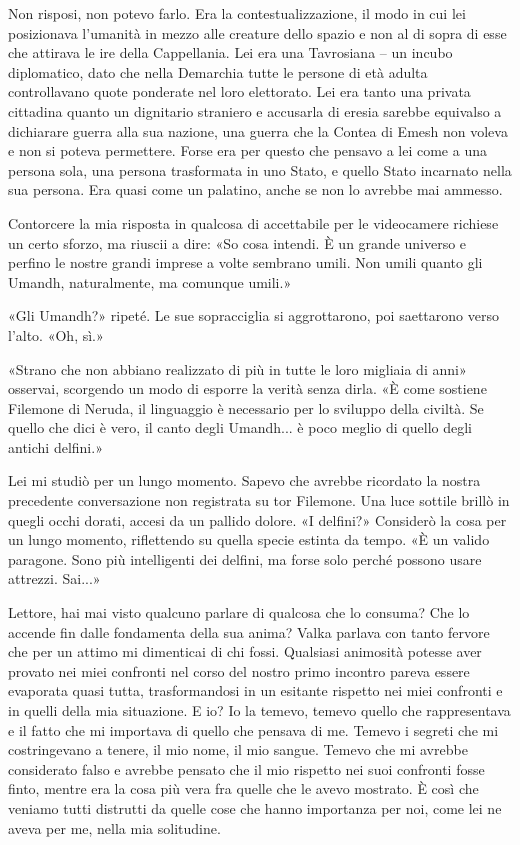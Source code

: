 Non risposi, non potevo farlo. Era la contestualizzazione, il modo in
cui lei posizionava l'umanità in mezzo alle creature dello spazio e non
al di sopra di esse che attirava le ire della Cappellania. Lei era una
Tavrosiana -- un incubo diplomatico, dato che nella Demarchia tutte le
persone di età adulta controllavano quote ponderate nel loro elettorato.
Lei era tanto una privata cittadina quanto un dignitario straniero e
accusarla di eresia sarebbe equivalso a dichiarare guerra alla sua
nazione, una guerra che la Contea di {Emesh} non voleva e non si poteva
permettere. Forse era per questo che pensavo a lei come a una persona
sola, una persona trasformata in uno Stato, e quello Stato incarnato
nella sua persona. Era quasi come un palatino, anche se non lo avrebbe
mai ammesso.

Contorcere la mia risposta in qualcosa di accettabile per le videocamere
richiese un certo sforzo, ma riuscii a dire: «So cosa intendi. È un
grande universo e perfino le nostre grandi imprese a volte sembrano
umili. Non umili quanto gli Umandh, naturalmente, ma comunque umili.»

«Gli Umandh?» ripeté. Le sue sopracciglia si aggrottarono, poi
saettarono verso l'alto. «Oh, sì.»

«Strano che non abbiano realizzato di più in tutte le loro migliaia di
anni» osservai, scorgendo un modo di esporre la verità senza dirla. «È
come sostiene Filemone di Neruda, il linguaggio è necessario per lo
sviluppo della civiltà. Se quello che dici è vero, il canto degli
Umandh... è poco meglio di quello degli antichi delfini.»

Lei mi studiò per un lungo momento. Sapevo che avrebbe ricordato la
nostra precedente conversazione non registrata su tor Filemone. Una luce
sottile brillò in quegli occhi dorati, accesi da un pallido dolore. «I
delfini?» Considerò la cosa per un lungo momento, riflettendo su quella
specie estinta da tempo. «È un valido paragone. Sono più intelligenti
dei delfini, ma forse solo perché possono usare attrezzi. Sai...»

Lettore, hai mai visto qualcuno parlare di qualcosa che lo consuma? Che
lo accende fin dalle fondamenta della sua anima? Valka parlava con tanto
fervore che per un attimo mi dimenticai di chi fossi. Qualsiasi
animosità potesse aver provato nei miei confronti nel corso del nostro
primo incontro pareva essere evaporata quasi tutta, trasformandosi in un
esitante rispetto nei miei confronti e in quelli della mia situazione. E
io? Io la temevo, temevo quello che rappresentava e il fatto che mi
importava di quello che pensava di me. Temevo i segreti che mi
costringevano a tenere, il mio nome, il mio sangue. Temevo che mi
avrebbe considerato falso e avrebbe pensato che il mio rispetto nei suoi
confronti fosse finto, mentre era la cosa più vera fra quelle che le
avevo mostrato. È così che veniamo tutti distrutti da quelle cose che
hanno importanza per noi, come lei ne aveva per me, nella mia
solitudine.

